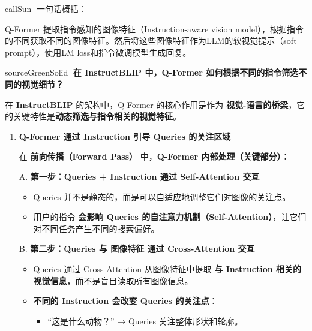 \documentclass[zihao=false,fontset=windows]{ctexart}
\begin{document}
\begin{feishubox}{callSun}{🌟}
一句话概括：\par

Q-Former 提取指令感知的图像特征（Instruction-aware vision model），根据指令的不同获取不同的图像特征。然后将这些图像特征作为LLM的软视觉提示（soft prompt），使用LM loss和指令微调模型生成回复。\par

\end{feishubox}
\begin{feishubox}{sourceGreenSolid}{🙋}
\textcolor{feishuBlue}{\textbf{在 InstructBLIP 中，Q-Former 如何根据不同的指令筛选不同的视觉细节？}}\par

在 \textbf{InstructBLIP} 的架构中，Q-Former 的核心作用是作为 \textbf{视觉-语言的桥梁}，它的关键特性是\textbf{动态筛选与指令相关的视觉特征}。\par

\begin{enumerate}
\item[\textcolor{feishuBlue}{1.}] \textbf{Q-Former 通过 Instruction 引导 Queries 的关注区域}\par
在 \textbf{前向传播（Forward Pass）} 中，\textbf{Q-Former 内部处理（关键部分）}：\par

A. \textbf{第一步：Queries + Instruction 通过 Self-Attention 交互}\par
\begin{itemize}
\item Queries 并不是静态的，而是可以自适应地调整它们对图像的关注点。

\item 用户的指令 \textbf{会影响 Queries 的自注意力机制（Self-Attention）}，让它们对不同任务产生不同的搜索偏好。

\end{itemize}
B. \textbf{第二步：Queries 与 图像特征 通过 Cross-Attention 交互}\par
\begin{itemize}
\item Queries 通过 Cross-Attention 从图像特征中提取 \textbf{与 Instruction 相关的视觉信息}，而不是盲目读取所有图像信息。

\item \textbf{不同的 Instruction 会改变 Queries 的关注点}：\par
\begin{itemize}
\item “这是什么动物？” → Queries 关注整体形状和轮廓。


\end{itemize}
\end{itemize}
\end{enumerate}
\end{feishubox}
\end{document}
